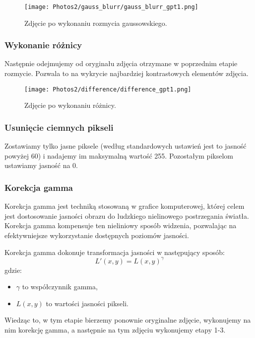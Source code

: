 \documentclass[]{mwart}
\begin{document}
\begin{figure}[H]
    \centering
    \texttt{[image: Photos2/gauss\_blurr/gauss\_blurr\_gpt1.png]}
    \caption{Zdjęcie po wykonaniu rozmycia gaussowskiego.}
\end{figure}

\subsubsection{Wykonanie różnicy}
Następnie odejmujemy od oryginału zdjęcia otrzymane w poprzednim etapie rozmycie.
Pozwala to na wykrycie najbardziej kontrastowych elementów zdjęcia.

\begin{figure}[H]
    \centering
    \texttt{[image: Photos2/difference/difference\_gpt1.png]}
    \caption{Zdjęcie po wykonaniu różnicy.}
\end{figure}

\subsubsection{Usunięcie ciemnych pikseli}
Zostawiamy tylko jasne piksele (według standardowych ustawień jest
to jasność powyżej 60) i nadajemy im maksymalną wartość 255.
Pozostałym pikselom ustawiamy jasność na 0.

\newpage
\subsubsection{Korekcja gamma}

Korekcja gamma jest techniką stosowaną w grafice komputerowej, której celem jest dostosowanie
jasności obrazu do ludzkiego nielinowego postrzegania światła. Korekcja gamma kompensuje ten
nieliniowy sposób widzenia, pozwalając na efektywniejsze wykorzystanie dostępnych poziomów jasności.

Korekcja gamma dokonuje transformacja jasności w następujący sposób:
\begin{equation}
    L'(x,y) = L(x,y)^{\gamma}
\end{equation}
gdzie:
\begin{itemize}
    \item $\gamma$ to współczynnik gamma,
    \item $L(x,y)$ to wartości jasności pikseli.
\end{itemize}

Wiedząc to, w tym etapie bierzemy ponownie oryginalne zdjęcie, wykonujemy
na nim korekcję gamma, a następnie na tym zdjęciu wykonujemy etapy 1-3.
\end{document}
